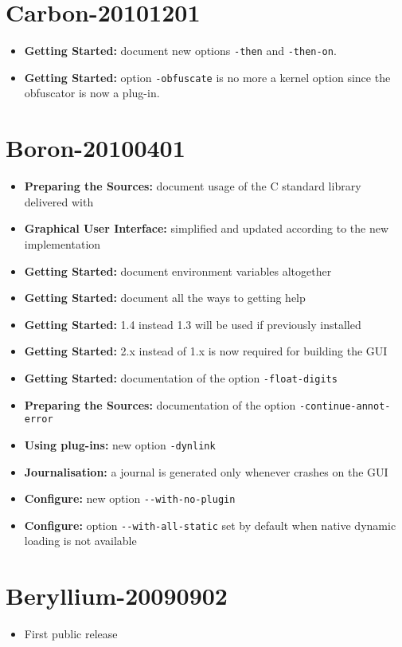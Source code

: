 \section*{Carbon-20101201}

\begin{itemize}
\item \textbf{Getting Started:} document new options \texttt{-then} and
  \texttt{-then-on}.
\item \textbf{Getting Started:} option \texttt{-obfuscate} is no more a kernel
  option since the obfuscator is now a plug-in.
\end{itemize}

\section*{Boron-20100401}

\begin{itemize}
\item \textbf{Preparing the Sources:} document usage of the C standard library
  delivered with \FramaC
\item \textbf{Graphical User Interface:} simplified and updated according to
  the new implementation
\item \textbf{Getting Started:} document environment variables altogether
\item \textbf{Getting Started:} document all the ways to getting help
\item \textbf{Getting Started:}  1.4 instead 1.3 will be used
  if previously installed
\item \textbf{Getting Started:}  2.x instead of 1.x is now
  required for building the GUI
\item \textbf{Getting Started:} documentation of the option
  \texttt{-float-digits}
\item \textbf{Preparing the Sources:} documentation of the option
  \texttt{-continue-annot-error}
\item \textbf{Using plug-ins:} new option \texttt{-dynlink}
\item \textbf{Journalisation:} a journal is generated only whenever \FramaC
  crashes on the GUI
\item \textbf{Configure:} new option \texttt{-{}-with-no-plugin}
\item \textbf{Configure:} option \texttt{-{}-with-all-static} set by default
  when native dynamic loading is not available
\end{itemize}

\section*{Beryllium-20090902}

\begin{itemize}
\item First public release
\end{itemize}

